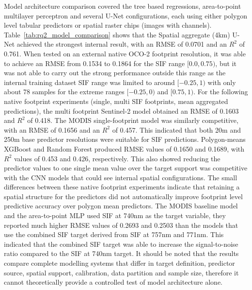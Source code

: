 Model architecture comparison covered the tree based regressions, area-to-point multilayer perceptron and several U-Net configurations, each using either polygon level tabular predictors or spatial raster chips (images with channels). Table~\ref{tab:rq2_model_comparison} shows that the Spatial aggregate (4km) U-Net achieved the strongest internal result, with an RMSE of 0.0701 and an $R^2$ of 0.761. When tested on an external native OCO-2 footprint resolution, it was able to achieve an RMSE from 0.1534 to 0.1864 for the SIF range $[0.0,0.75)$, but it was not able to  carry out the strong performance outside this range as the internal training dataset SIF range was limited to around $[-0.25,1)$ with only about 78 samples for the extreme ranges $[-0.25,0)$ and $[0.75,1)$. For the following native footprint experiments (single, multi SIF footprints, mean aggregated predictions), the multi footprint Sentinel-2 model obtained an RMSE of 0.1603 and $R^2$ of 0.418. The MODIS single-footprint model was similarly competitive, with an RMSE of 0.1656 and an $R^2$ of 0.457. This indicated that both 20m and 250m base predictor resolutions were suitable for SIF predictions. Polygon-means XGBoost and Random Forest produced RMSE values of 0.1650 and 0.1689, with $R^2$ values of 0.453 and 0.426, respectively. This also showed reducing the predictor values to one single mean value over the target support was competitive with the CNN models that could see internal spatial configurations. The small differences between these native footprint experiments indicate that retaining a spatial structure for the predictors did not automatically improve footprint level predictive accuracy over polygon mean predictors. The MODIS baseline model and the area-to-point MLP used SIF at 740nm as the target variable, they reported much higher RMSE values of 0.2693 and 0.2503 than the models that use the combined SIF target derived from SIF at 757nm and 771nm. This indicated that the combined SIF target was able to increase the signal-to-noise ratio compared to the SIF at 740nm target. It should be noted that the results compare complete modelling systems that differ in target definition, predictor source, spatial support, calibration, data partition and sample size, therefore it cannot theoretically provide a controlled test of model architecture alone.

